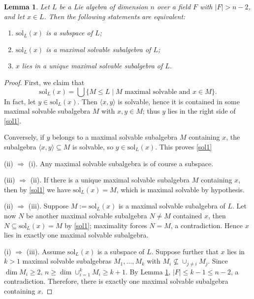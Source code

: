 \documentclass[11pt]{amsart}
\theoremstyle{plain}
\newtheorem{lemma}[theorem]{Lemma}
\def\sol{\mathrm{sol}}
\begin{document}
\begin{lemma}\label{solvabilizer1}
Let $L$ be a Lie algebra of dimension $n$ over a field $F$ with $|F|> n-2$, and let $x\in L$. Then the following statements are equivalent:
\begin{enumerate}[\rm(i)]
  \item $\sol_L(x)$ is a \emph{subspace} of $L$;
  \item $\sol_L(x)$ is a \emph{maximal solvable subalgebra} of $L$;
  \item $x$ lies in a unique maximal solvable subalgebra of $L$.
\end{enumerate}
\end{lemma}

\begin{proof}
First, we claim that
\begin{equation}\label{sol1}
\sol_L(x) = \bigcup\big\{M\le L \mid M \text{ maximal solvable and } x\in M \big\}.
\end{equation}
In fact, let $y\in \sol_L(x)$. Then $\langle x,y\rangle$ is solvable, hence it is contained in some
maximal solvable subalgebra $M$ with $x,y\in M$; thus $y$ lies in the right side of \eqref{sol1}.

Conversely, if $y$ belongs to a maximal solvable subalgebra $M$ containing $x$, the subalgebra $\langle x, y\rangle\subseteq M$ is solvable, so $y\in\sol_L(x)$. This proves \eqref{sol1}
\medskip

\noindent\rm{(ii) $\Rightarrow$ (i).} Any maximal solvable subalgebra is of course a subspace.
\medskip

\noindent\rm{(iii) $\Rightarrow$ (ii).} If there is a unique maximal solvable subalgebra $M$
containing $x$, then by \eqref{sol1} we have $\sol_L(x)=M$, which is maximal solvable by hypothesis.
\medskip

\noindent\rm{(ii) $\Rightarrow$ (iii).} Suppose $M:=\sol_L(x)$ is a maximal solvable subalgebra of $L$. Let now $N$ be another maximal solvable subalgebra $N\neq M$ contained $x$, then $N \subseteq \sol_L(x) = M$ by \eqref{sol1}; maximality forces
$N=M$, a contradiction.  Hence $x$ lies in exactly one maximal
solvable subalgebra.
\medskip


\noindent\rm{(i) $\Rightarrow$ (iii).}  Assume $\sol_L(x)$ is a subspace of $L$.  Suppose further that $x$ lies in $k>1$ maximal solvable subalgebras $M_1, \ldots, M_k$ with $M_i \not\subseteq \cup_{j\neq i} M_j$. Since $\dim M_i\geq 2$, $n\geq \dim \cup_{i=1}^kM_i\geq k+1$. By Lemma \ref{solvabilizer1}, $|F|\leq k-1\leq n-2$, a contradiction. Therefore, there is exactly one maximal solvable subalgebra containing $x$.
\end{proof}
 
\end{document}
